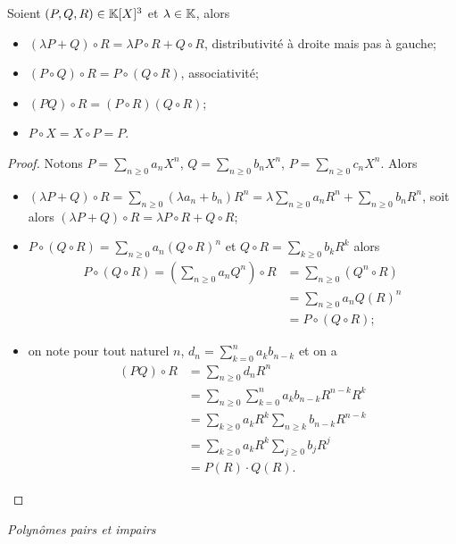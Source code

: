 \begin{prop}
  Soient $(P,Q,R) \in \mathbb{K}[X]^3$ et $\lambda \in \mathbb{K}$, alors
  \begin{itemize}
  \item $(\lambda P+Q)\circ R = \lambda P \circ R +Q \circ R$, distributivité à droite mais pas à gauche;
  \item $(P \circ Q) \circ R = P \circ (Q \circ R)$, associativité;
  \item $(PQ)\circ R = (P \circ R)(Q \circ R)$;
  \item $P \circ X = X \circ P=P$.
  \end{itemize}
\end{prop}
\begin{proof}
  Notons $P=\sum_{n \geqslant 0} a_n X^n$, $Q=\sum_{n \geqslant 0} b_n X^n$, $P=\sum_{n \geqslant 0} c_n X^n$. Alors
  \begin{itemize}
  \item $(\lambda P+Q)\circ R = \sum_{n \geqslant 0} (\lambda a_n+b_n) R^n = \lambda \sum_{n \geqslant 0} a_n R^n + \sum_{n \geqslant 0} b_n R^n$, soit alors $ (\lambda P+Q)\circ R = \lambda P \circ R +Q \circ R$;
  \item $P \circ (Q \circ R) = \sum_{n \geqslant 0} a_n (Q \circ R)^n$ et $Q \circ R = \sum_{k \geqslant 0} b_k R^k$ alors
    \begin{align}
      P \circ (Q \circ R) = \left(\sum_{n \geqslant 0} a_n Q^n \right) \circ R &= \sum_{n \geqslant 0} (Q^n \circ R) \\
      &= \sum_{n \geqslant 0} a_n Q(R)^n\\
      &=P \circ (Q \circ R);
    \end{align}
  \item on note pour tout naturel $n$, $d_n=\sum_{k=0}^n a_k b_{n-k}$ et on a
    \begin{align}
      (PQ)\circ R &= \sum_{n \geqslant 0} d_n R^n \\
      &= \sum_{n \geqslant 0} \sum_{k=0}^n a_k b_{n-k} R^{n-k}R^k \\
      &= \sum_{k \geqslant 0} a_k R^k \sum_{n \geqslant k} b_{n-k} R^{n-k}\\
      &=\sum_{k\geqslant 0} a_k R^k \sum_{j \geqslant 0} b_j R^j\\
      &=P(R) \cdot Q(R).
    \end{align}
  \end{itemize}
\end{proof}

\emph{Polynômes pairs et impairs}

